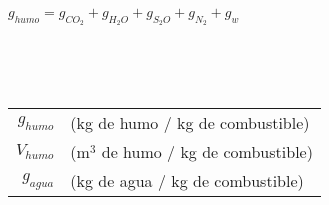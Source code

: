 \documentclass[11pt,a4paper]{article}
\begin{document}
		\begin{cajita}
		
		
		\vspace{.5cm}
		
		$g_{humo}= g_{CO_2} + g_{H_2O} + g_{S_2O} + g_{N_2} + g_w$\\\vspace{.2cm}
		
		\\\vspace{.3cm}
		
		\\\vspace{.2cm}
		
		\begin{tabular}{r l}
			$g_{humo}$ & (kg de humo / kg de combustible)\\[.2cm]
			$V_{humo}$ & (m$^3$ de humo / kg de combustible)\\[.2cm]
			$g_{agua}$ & (kg de agua / kg de combustible)\\
		\end{tabular}
	
	\end{cajita}
	
\end{document}
